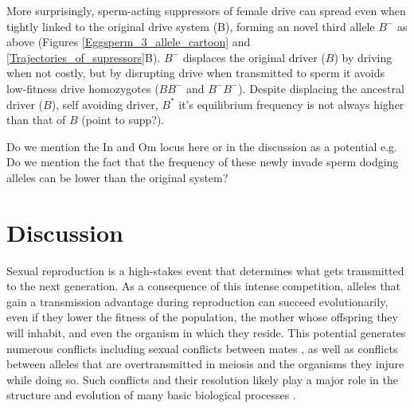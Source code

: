 \documentclass[12pt,letterpaper]{article}
\newcommand{\gc}[1]{{ \color{red} #1}}
\newcommand{\yb}[1]{{ \color{blue} #1}}
\begin{document}
More surprisingly, sperm-acting suppressors of female drive can spread
	even when tightly linked to the original drive system (B), forming
	an novel third allele $B^{-}$ as above 
	(Figures \ref{Eggsperm_3_allele_cartoon} and \ref{Trajectories_of_supressors}B). 
$B^{-}$ displaces the original driver ($B$) by driving when not costly, 
	but by disrupting drive when transmitted to sperm it avoids low-fitness drive homozygotes ($BB^-$ and $B^-B^-$). 
Despite displacing the ancestral driver ($B$), self avoiding driver, $B^*$ it's equilibrium frequency is not always higher than that of $B$ \yb{(point to supp?)}. 

\gc{Do we mention the In and Om locus here or in the discussion as a
	 potential e.g. Do we mention the fact that the frequency of these
	 newly invade sperm dodging alleles can be lower than the original system?}\\

\section*{Discussion}



Sexual reproduction is a high-stakes event that determines what gets transmitted to the next generation.  
As a consequence of this intense competition, alleles that gain a transmission advantage during reproduction 
	can succeed evolutionarily, even if they lower the 
        fitness of the population, 
	the mother whose offspring they will inhabit, 
	and even the organism in which they reside. 
This potential generates numerous conflicts  \cite{Burt2006} including sexual conflicts between mates \cite{Arnqvist2005}, 
	as well as conflicts between alleles that are overtransmitted in meiosis and the organisms they injure while doing so. 
Such conflicts and their resolution likely play a major role in the structure and evolution of many basic biological processes \citep{Rice2013}.
\end{document}
